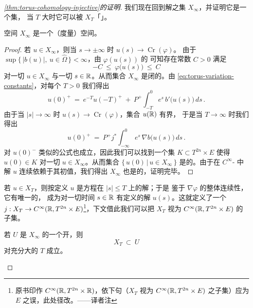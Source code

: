 \begin{proof}[\cref*{thm:torus-cohomology-injective}的证明]
我们现在回到\trBounded{}解之集 $X_{\infty}$，并证明它是一个\trCompact{}集，%
当 $T$ 大时它可以被 $X_{T}$「\trApproximation」。

\begin{proposition}\label{prop:xinf-compact-space}
空间 $X_{\infty}$ 是一个\trCompact{}（度量）空间。
\end{proposition}

\begin{proof}
若 $u\in X_{\infty}$，则当 $s\to\pm\infty$ 时 $u(s)\to\operatorname{Cr}(\varphi)$。%
由于 $\sup\{\,|b(u)|,\ u\in\widehat{\Omega}\,\}<\infty$，由 $\varphi(u(s))$ 的%
\trMonotonicity{}可知存在常数 $C>0$ 满足
\begin{equation}\label{eq:torus-phi-bounded}
-C\ \leq\ \varphi\bigl(u(s)\bigr)\ \leq\ C
\end{equation}
对一切 $u\in X_{\infty}$ 与一切 $s\in\mathbb{R}$。从而集合 $X_{\infty}$ 是闭的。由%
\trVariationOfConstantsFormula{} \eqref{eq:torus-variation-constants}，对每个%
$T>0$ 我们得出
\begin{equation}\label{eq:torus-u0-plus}
u(0)^{+}\ =\ e^{-T}u(-T)^{+}\ +\ P^{+}\int_{-T}^{0}e^{s}\,b'\bigl(u(s)\bigr)\,ds\,.
\end{equation}
由于当 $|s|\to\infty$ 时 $u(s)\to\operatorname{Cr}(\varphi)$，集合 $u(\mathbb{R})$ 有界，%
于是当 $T\to\infty$ 时我们得出
\begin{equation}\label{eq:torus-u0-plus-limit}
u(0)^{+}\ =\ P^{+}j^{*}\int_{-\infty}^{0}e^{s}\,\nabla b\bigl(u(s)\bigr)\,ds\,.
\end{equation}
对 $u(0)^{-}$ 类似的公式也成立，因此我们可以找到一个\trCompact{}集%
$K\subset T^{2n}\times E$ 使得 $u(0)\in K$ 对一切 $u\in X_{\infty}$。从而集合%
$\{\,u(0)\,|\,u\in X_{\infty}\,\}$ 是\trCompact{}的。由于在 $C^{\infty}$-\trTopology{}%
中解 $u$ 连续依赖于其初值，我们得出 $X_{\infty}$ 也是\trCompact{}的，证明完毕。
\end{proof}

若 $u\in X_{T}$，则按定义 $u$ 是\trGradient{}方程在 $|s|\leq T$ 上的解；于是%
鉴于 $\nabla\varphi$ 的整体\trLipschitz{}连续性，它有唯一的\trContinuation，%
成为对一切时间 $s\in\mathbb{R}$ 有定义的解 $u(s)$。这就定义了一个\trInclusionMapping{}%
$j:X_{T}\to C^{\infty}(\mathbb{R},T^{2n}\times E)$\footnote{原书印作%
$C^{\infty}(\mathbb{R},T^{2n}\times\mathbb{R})$，依下句（$X_{T}$ 视为 $C^{\infty}(\mathbb{R},T^{2n}\times E)$%
之子集）应为 $E$ 之误，此处径改。——译者注}，下文借此我们可以把 $X_{T}$ 视为%
$C^{\infty}(\mathbb{R},T^{2n}\times E)$ 的子集。

\begin{proposition}\label{prop:xt-in-neighborhood}
若 $U$ 是 $X_{\infty}$ 的一个开\trNeighborhood，则
\[
X_{T}\ \subset\ U
\]
对充分大的 $T$ 成立。
\end{proposition}


\end{proof}
